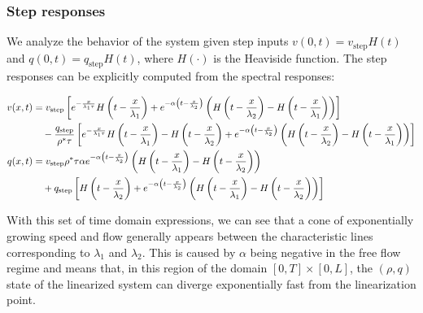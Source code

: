\documentclass[preprint]{elsarticle}
\begin{document}
\subsubsection{Step responses}
We analyze the behavior of the system given step inputs $v(0,t)=v_{\text{step}}H(t)$ and $q(0,t)=q_{\text{step}}H(t)$, where $H(\cdot)$ is the Heaviside function. The step responses can be explicitly computed from the spectral responses:

\begin{align} 
v(x,t) &= v_{\text{step}}
\left[
	e^{-\frac{x}{\lambda_{1}\tau}} H\left(t-\frac{x}{\lambda_{1}}\right)
	+
	e^{-\alpha \left(t - \frac{x}{\lambda_{2}} \right)}
	\left(
		H\left(t - \frac{x}{\lambda_{2}} \right) - H\left(t - \frac{x}{\lambda_{1}} \right)
	\right)
\right]
\notag \\
&\quad
- \dfrac{q_{\text{step}}}{\rho^* \tau}
\left[
	e^{-\frac{x}{\lambda_{1}\tau}} H\left(t-\frac{x}{\lambda_{1}}\right) - H\left(t - \frac{x}{\lambda_{2}} \right) +
	e^{-\alpha \left(t - \frac{x}{\lambda_{2}} \right)}
	\left(
		H\left(t - \frac{x}{\lambda_{2}} \right) - H\left(t - \frac{x}{\lambda_{1}} 	\right)
	\right)
\right] \\
	q(x,t) &= v_{\text{step}} \rho^*\tau \alpha e^{-\alpha \left(t - \frac{x}{\lambda_{2}} \right)}
		\left(
		H\left(t - \frac{x}{\lambda_{1}} \right) - H\left(t - \frac{x}{\lambda_{2}} 	\right)
	\right)
\notag \\
&\quad+ 
q_{\text{step}}
\left[
H\left(t - \frac{x}{\lambda_{2}} \right) + e^{-\alpha \left(t - \frac{x}{\lambda_{2}} \right)}
		\left(
		H\left(t - \frac{x}{\lambda_{1}} \right) - H\left(t - \frac{x}{\lambda_{2}} 	\right)
	\right)
\right]
\end{align}

With this set of time domain expressions, we can see that a cone of exponentially growing speed and flow generally appears between the characteristic lines corresponding to $\lambda_{1}$ and $\lambda_{2}$. This is caused by $\alpha$ being negative in the free flow regime and means that, in this region of the domain $\left[0,T\right] \times \left[0,L\right]$, the $\left(\rho,q\right)$ state of the linearized system can diverge exponentially fast from the linearization point.
\end{document}
